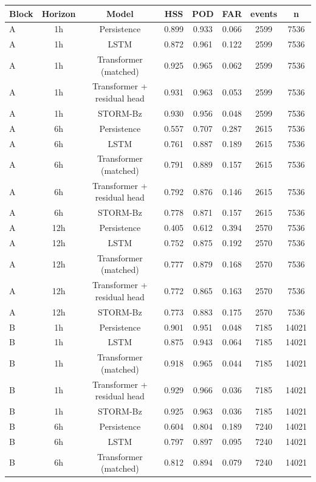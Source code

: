 \begin{tabular}{lccccccc}
\toprule
Block & Horizon & Model & HSS & POD & FAR & events & n \\
\midrule
A & 1h & Persistence & 0.899 & 0.933 & 0.066 & 2599 & 7536 \\
A & 1h & LSTM & 0.872 & 0.961 & 0.122 & 2599 & 7536 \\
A & 1h & Transformer (matched) & 0.925 & 0.965 & 0.062 & 2599 & 7536 \\
A & 1h & Transformer + residual head & 0.931 & 0.963 & 0.053 & 2599 & 7536 \\
A & 1h & STORM-Bz & 0.930 & 0.956 & 0.048 & 2599 & 7536 \\
A & 6h & Persistence & 0.557 & 0.707 & 0.287 & 2615 & 7536 \\
A & 6h & LSTM & 0.761 & 0.887 & 0.189 & 2615 & 7536 \\
A & 6h & Transformer (matched) & 0.791 & 0.889 & 0.157 & 2615 & 7536 \\
A & 6h & Transformer + residual head & 0.792 & 0.876 & 0.146 & 2615 & 7536 \\
A & 6h & STORM-Bz & 0.778 & 0.871 & 0.157 & 2615 & 7536 \\
A & 12h & Persistence & 0.405 & 0.612 & 0.394 & 2570 & 7536 \\
A & 12h & LSTM & 0.752 & 0.875 & 0.192 & 2570 & 7536 \\
A & 12h & Transformer (matched) & 0.777 & 0.879 & 0.168 & 2570 & 7536 \\
A & 12h & Transformer + residual head & 0.772 & 0.865 & 0.163 & 2570 & 7536 \\
A & 12h & STORM-Bz & 0.773 & 0.883 & 0.175 & 2570 & 7536 \\
B & 1h & Persistence & 0.901 & 0.951 & 0.048 & 7185 & 14021 \\
B & 1h & LSTM & 0.875 & 0.943 & 0.064 & 7185 & 14021 \\
B & 1h & Transformer (matched) & 0.918 & 0.965 & 0.044 & 7185 & 14021 \\
B & 1h & Transformer + residual head & 0.929 & 0.966 & 0.036 & 7185 & 14021 \\
B & 1h & STORM-Bz & 0.925 & 0.963 & 0.036 & 7185 & 14021 \\
B & 6h & Persistence & 0.604 & 0.804 & 0.189 & 7240 & 14021 \\
B & 6h & LSTM & 0.797 & 0.897 & 0.095 & 7240 & 14021 \\
B & 6h & Transformer (matched) & 0.812 & 0.894 & 0.079 & 7240 & 14021 \\

\end{tabular}
